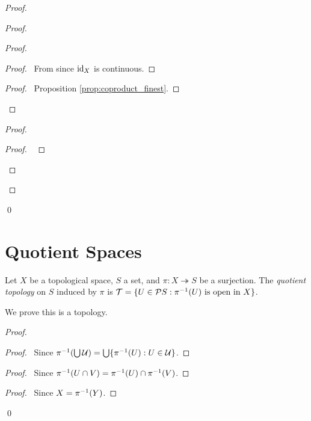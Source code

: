 \begin{proof}
\begin{proof}
\begin{proof}
		\begin{proof}
			\pf\ From  since $\mathrm{id}_{X}$ is continuous.
		\end{proof}
		\begin{proof}
			\pf\ Proposition \ref{prop:coproduct_finest}.
		\end{proof}
	\end{proof}
	\begin{proof}
		\begin{proof}
			\pf\ 
		\end{proof}
	\end{proof}
\end{proof}
\qed
\end{proof}

\section{Quotient Spaces}

\begin{df}
Let $X$ be a topological space, $S$ a set, and $\pi : X \twoheadrightarrow S$ be a surjection. The \emph{quotient topology} on $S$ induced by $\pi$ is $\mathcal{T} = \{ U \in \mathcal{P} S : {\pi}^{-1}(U) \text{ is open in } X \}$.

We prove this is a topology.
\end{df}

\begin{proof}
\pf
{}
\begin{proof}
	\pf\ Since ${\pi}^{-1}(\bigcup \mathcal{U}) = \bigcup \{ {\pi}^{-1}(U) : U \in \mathcal{U} \}$.
\end{proof}
\begin{proof}
	\pf\ Since ${\pi}^{-1}(U \cap V) = {\pi}^{-1}(U) \cap {\pi}^{-1}(V)$.
\end{proof}
\begin{proof}
	\pf\ Since $X = {\pi}^{-1}(Y)$.
\end{proof}
\qed
\end{proof}

